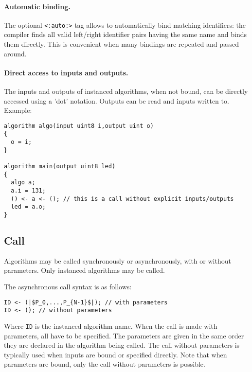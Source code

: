 \documentclass[a4]{article}
\newcommand\todo[1]{{\color{magenta}\textbf{TODO:} #1}}
\begin{document}
\paragraph{Automatic binding.}
The optional \texttt{<:auto:>} tag allows to automatically bind matching identifiers:
the compiler finds all valid left/right identifier pairs having the same name and
binds them directly. This is convenient when many bindings are repeated and passed
around. 

\paragraph{Direct access to inputs and outputs.}

The inputs and outputs of instanced algorithms, when not bound,
can be directly accessed using a 'dot' notation. Outputs can be read
and inputs written to.
Example:

\begin{verbatim}
algorithm algo(input uint8 i,output uint o)
{
  o = i;
}

algorithm main(output uint8 led)
{
  algo a;
  a.i = 131;
  () <- a <- (); // this is a call without explicit inputs/outputs
  led = a.o;
}
\end{verbatim}







\subsection{Call}

Algorithms may be called synchronously or asynchronously, with or without parameters. Only instanced algorithms may be called.

The asynchronous call syntax is as follows:
\begin{verbatim}
ID <- (|$P_0,...,P_{N-1}$|); // with parameters
ID <- (); // without parameters
\end{verbatim}
Where \texttt{ID} is the instanced algorithm name.
When the call is made with parameters, all have to be specified. The parameters
are given in the same order they are declared in the algorithm being called.
The call without parameters is typically used when inputs are bound or specified
directly. Note that when parameters are bound, only the call without parameters
is possible.
\end{document}
